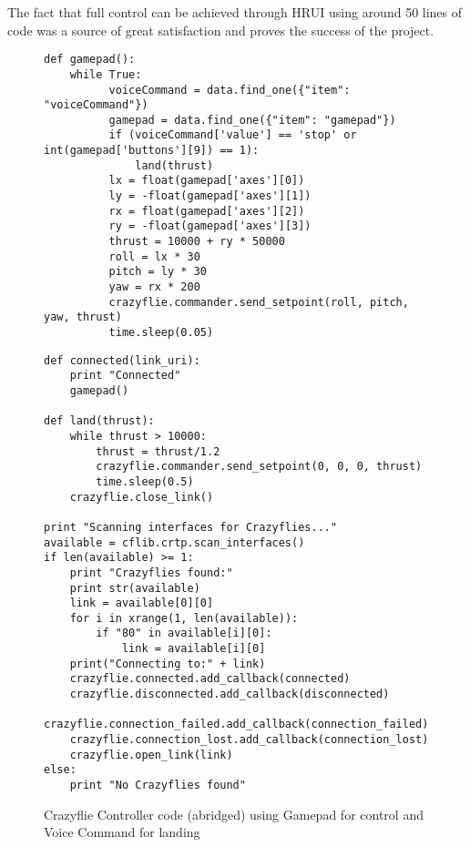 The fact that full control can be achieved through HRUI using around 50 lines of code was a source of great satisfaction and proves the 
success of the project.
\begin{figure}[H]  
\centering
\captionsetup{justification=centering}
\begin{verbatim}
def gamepad():
    while True:
          voiceCommand = data.find_one({"item": "voiceCommand"})
          gamepad = data.find_one({"item": "gamepad"})
          if (voiceCommand['value'] == 'stop' or int(gamepad['buttons'][9]) == 1):
              land(thrust)
          lx = float(gamepad['axes'][0])
          ly = -float(gamepad['axes'][1])
          rx = float(gamepad['axes'][2])
          ry = -float(gamepad['axes'][3])
          thrust = 10000 + ry * 50000
          roll = lx * 30
          pitch = ly * 30
          yaw = rx * 200
          crazyflie.commander.send_setpoint(roll, pitch, yaw, thrust)
          time.sleep(0.05)
\end{verbatim}
\end{figure}
\begin{figure}[H]  
\centering
\captionsetup{justification=centering}
\begin{verbatim}
def connected(link_uri):
    print "Connected"
    gamepad()

def land(thrust):
    while thrust > 10000:
        thrust = thrust/1.2
        crazyflie.commander.send_setpoint(0, 0, 0, thrust)
        time.sleep(0.5)
    crazyflie.close_link()

print "Scanning interfaces for Crazyflies..."
available = cflib.crtp.scan_interfaces()
if len(available) >= 1:
    print "Crazyflies found:"
    print str(available)
    link = available[0][0]
    for i in xrange(1, len(available)):
        if "80" in available[i][0]:
            link = available[i][0]
    print("Connecting to:" + link)
    crazyflie.connected.add_callback(connected)
    crazyflie.disconnected.add_callback(disconnected)
    crazyflie.connection_failed.add_callback(connection_failed)
    crazyflie.connection_lost.add_callback(connection_lost)
    crazyflie.open_link(link)
else:
    print "No Crazyflies found"
\end{verbatim}
\caption{Crazyflie Controller code (abridged) using Gamepad for control and Voice Command for landing}
\end{figure}
